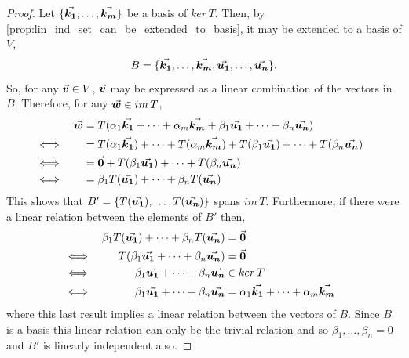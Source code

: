 \documentclass[MathsNotesBase.tex]{subfiles}
\begin{document}
{		\bigskip
		\begin{proof}
			Let ${ \{\vec{\bm{k_1}}, \dots, \vec{\bm{k_m}}\} }$ be a basis of ${ ker\,T }$. Then, by \autoref{prop:lin_ind_set_can_be_extended_to_basis}, it may be extended to a basis of $V$,
			\[ B = \{\vec{\bm{k_1}}, \dots, \vec{\bm{k_m}}, \vec{\bm{u_1}}, \dots, \vec{\bm{u_n}}\}. \]
			So, for any ${ \vec{\bm{v}} \in V }$, $\vec{\bm{v}}$ may be expressed as a linear combination of the vectors in $B$. Therefore, for any ${ \vec{\bm{w}} \in im\,T }$,
			\begin{align*}
			&& \vec{\bm{w}} &= T(\alpha_1\vec{\bm{k_1}} + \cdots + \alpha_m\vec{\bm{k_m}} + \beta_1\vec{\bm{u_1}} + \cdots + \beta_n\vec{\bm{u_n}})  \\
			&\iff &  &= T(\alpha_1\vec{\bm{k_1}}) + \cdots + T(\alpha_m\vec{\bm{k_m}}) + T(\beta_1\vec{\bm{u_1}}) + \cdots + T(\beta_n\vec{\bm{u_n}}) &\\
			&\iff &  &= \vec{\bm{0}} + T(\beta_1\vec{\bm{u_1}}) + \cdots + T(\beta_n\vec{\bm{u_n}})   &\text{\scriptsize{}} \\
			&\iff &  &= \beta_1T(\vec{\bm{u_1}}) + \cdots + \beta_nT(\vec{\bm{u_n}})   &\text{\scriptsize{}} \\
			\end{align*}
			This shows that ${ B' = \{T(\vec{\bm{u_1}}), \dots, T(\vec{\bm{u_n}})\} }$ spans $im\,T$. Furthermore, if there were a linear relation between the elements of $B'$ then,
			\begin{align*}
			&& \beta_1T(\vec{\bm{u_1}}) + \cdots + \beta_nT(\vec{\bm{u_n}}) &= \vec{\bm{0}} \\
			&\iff & T(\beta_1\vec{\bm{u_1}} + \cdots + \beta_n\vec{\bm{u_n}}) &= \vec{\bm{0}} & \\
			&\iff & \beta_1\vec{\bm{u_1}} + \cdots + \beta_n\vec{\bm{u_n}} &\in ker\,T &\text{\scriptsize{}} \\
			&\iff & \beta_1\vec{\bm{u_1}} + \cdots + \beta_n\vec{\bm{u_n}} &= \alpha_1\vec{\bm{k_1}} + \cdots + \alpha_m\vec{\bm{k_m}} &\text{\scriptsize{}} \\
			\end{align*}
			where this last result implies a linear relation between the vectors of $B$. Since $B$ is a basis this linear relation can only be the trivial relation and so ${ \beta_1, \dots, \beta_n = 0 }$ and $B'$ is linearly independent also.
		\end{proof}
		
}
\end{document}
